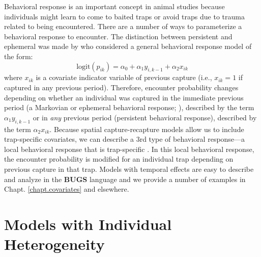 Behavioral response is an important concept in animal studies
because individuals might learn to come to baited traps or avoid traps
due to trauma related to being encountered.  There are a number of
ways to parameterize a behavioral response to encounter. The
distinction between persistent and ephemeral was made by
\citet{yang_chao:2005} who considered a general behavioral response
model of the form:
\[
\mbox{logit}(p_{ik}) = \alpha_{0} + \alpha_{1} y_{i,k-1} + \alpha_{2} x_{ik}
\]
where $x_{ik}$ is a covariate indicator variable of previous capture
(i.e., $x_{ik} = 1$ if captured in any previous period). Therefore,
encounter probability changes depending on whether an individual was
captured in the immediate previous period (a Markovian or ephemeral behavioral
response; \citep{yang_chao:2005}), described by the term
$\alpha_{1} y_{i,k-1}$ or in {\it any} previous period (persistent behavioral
response), described by the term  $\alpha_{2} x_{ik}$.
Because spatial capture-recapture models allow us to include
trap-specific covariates, we can describe a 3rd type of behavioral
response---a local behavioral response that is trap-specific
\citep{royle_etal:2011jwm}. In this local behavioral response, the
encounter probability is modified for an individual trap depending on
previous capture in that trap.
Models with temporal effects are easy to describe and analyze in the {\bf BUGS} language
and we provide a number of examples in
Chapt. \ref{chapt.covariates} and elsewhere.


\section{ Models with Individual Heterogeneity}
\label{closed.sec.modelmh}

